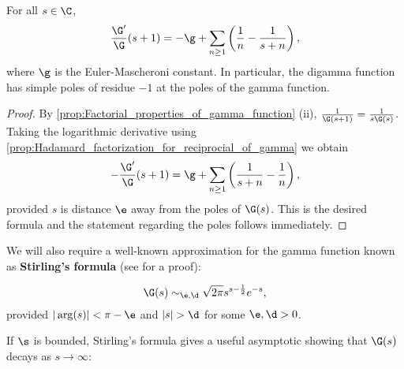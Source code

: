     \begin{corollary}\label{cor:logarithmic_derivative_of_gamma}
      For all $s \in \C$,
      \[
        \frac{\G'}{\G}(s+1) = -\g+\sum_{n \ge 1}\left(\frac{1}{n}-\frac{1}{s+n}\right),
      \]
      where $\g$ is the Euler-Mascheroni constant. In particular, the digamma function has simple poles of residue $-1$ at the poles of the gamma function.
    \end{corollary}
    \begin{proof}
      By \cref{prop:Factorial_properties_of_gamma_function} (ii), $\frac{1}{\G(s+1)} = \frac{1}{s\G(s)}$. Taking the logarithmic derivative using \cref{prop:Hadamard_factorization_for_reciprocial_of_gamma} we obtain
      \[
        -\frac{\G'}{\G}(s+1) = \g+\sum_{n \ge 1}\left(\frac{1}{s+n}-\frac{1}{n}\right),
      \]
      provided $s$ is distance $\e$ away from the poles of $\G(s)$. This is the desired formula and the statement regarding the poles follows immediately.
    \end{proof}
    
    We will also require a well-known approximation for the gamma function known as \textbf{Stirling's formula} (see \cite{remmert1998classical} for a proof):

    \begin{theorem}
    \phantom{}
      \[
        \G(s) \sim_{\e,\d} \sqrt{2\pi}s^{s-\frac{1}{2}}e^{-s},
      \]
      provided $|\arg(s)| < \pi-\e$ and $|s| > \d$ for some $\e,\d > 0$.
    \end{theorem}

    If $\s$ is bounded, Stirling's formula gives a useful asymptotic showing that $\G(s)$ decays as $s \to \infty$:
    
